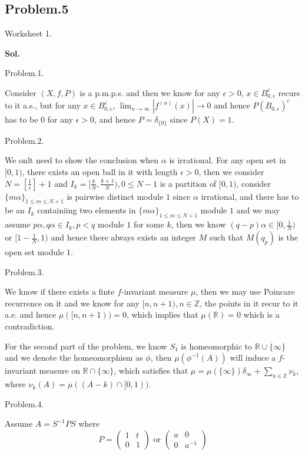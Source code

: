 \documentclass[lang=en,11pt,a4paper,citestyle =authoryear]{elegantpaper}
\newcommand{\Z}{\mathbb{Z}}
\newcommand{\R}{\mathbb{R}}
\begin{document}
\subsection*{Problem.5}
Worksheet 1.\par
\vspace{0.5em}
\textbf{Sol.} \par
Problem.1.\par
Consider $(X,f,P)$ is a p.m.p.s. and then we know for any $\epsilon > 0$, $x\in B_{0,\epsilon}^c$ recurs to it a.s., but for any $x\in B_{0,\epsilon}^c$, $\lim_{n\to\infty} |f^{(n)}(x)| \to 0$ and hence $P(B_{0,\epsilon})^c$ has to be 0 for any $\epsilon > 0$, and hence $P = \delta_{\{0\}}$ since $P(X) = 1$.\par
Problem.2.\par
We onlt need to show the conclusion when $\alpha$ is irrational. For any open set in $[0,1)$, there exists an open ball in it with length $\epsilon > 0$, then we consider $N = [\tfrac{1}{\epsilon}]+1$ and $I_k = [\tfrac{k}{N}, \tfrac{k+1}{N}), 0 \leq N-1$ is a partition of $[0,1)$, consider $\{m\alpha\}_{1\leq m \leq N+1}$ is pairwise distinct module $1$ since $\alpha$ irrational, and there has to be an $I_k$ containiing two elements in $\{m\alpha\}_{1\leq m \leq N+1}$ module $1$ and we may assume $p\alpha,q\alpha \in I_k,p<q$ module $1$ for some $k$, then we know $(q-p)\alpha \in [0,\tfrac{1}{N})$ or $[1-\tfrac{1}{N},1)$ and hence there always exists an integer $M$ such that $M(q_p)$ is the open set module $1$.\par
Problem.3.\par
We know if there exists a finte $f$-invariant measure $\mu$, then we may use Poincare recurrence on it and we know for any $[n,n+1), n\in\Z$, the points in it recur to it a.e. and hence $\mu([n,n+1)) = 0$, which implies that $\mu(\R) = 0$ which is a contradiction.\par
For the second part of the problem, we know $S_1$ is homeomorphic to $\R\cup\{\infty\}$ and we denote the homeomorphism as $\phi$, then $\mu(\phi^{-1}(A))$ will induce a $f$-invariant measure on $\R\cap\{\infty\}$, which satisfies that $\mu = \mu(\{\infty\})\delta_{\infty} + \sum\limits_{n\in\Z} \nu_k$, where $\nu_k(A) = \mu((A-k)\cap[0,1))$.\par
Problem.4.\par
Assume $A = S^{-1}PS$ where
\[P=\left(\begin{array}{c|c} 1 & t \\ 0 & 1\end{array}\right)\text{ or }\left(\begin{array}{c|c} a & 0 \\ 0 & a^{-1}\end{array}\right)
\]
\end{document}
